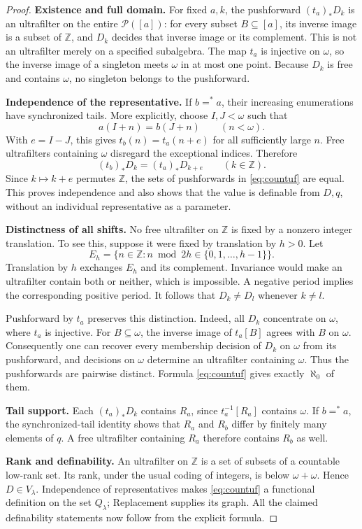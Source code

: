 \documentclass[11pt,letterpaper]{article}
\theoremstyle{definition}
\numberwithin{equation}{section}
\newcommand{\Pow}{\mathcal P}
\begin{document}
\begin{proof}
\textbf{Existence and full domain.}
For fixed $a,k$, the pushforward $(t_a)_*D_k$ is an ultrafilter on the
entire $\Pow([a])$: for every subset $B\subseteq[a]$, its inverse image is
a subset of $\mathbb Z$, and $D_k$ decides that inverse image or its
complement. This is not an ultrafilter merely on a specified subalgebra.
The map $t_a$ is injective on $\omega$, so the inverse image of a singleton
meets $\omega$ in at most one point. Because $D_k$ is free and contains
$\omega$, no singleton belongs to the pushforward.

\textbf{Independence of the representative.}
If $b=^*a$, their increasing enumerations have synchronized tails. More
explicitly, choose $I,J<\omega$ such that
\[
                            a(I+n)=b(J+n)
                                    \qquad(n<\omega).
\]
With $e=I-J$, this gives $t_b(n)=t_a(n+e)$ for all sufficiently large
$n$. Free ultrafilters containing $\omega$ disregard the exceptional
indices. Therefore
\[
                           (t_b)_*D_k=(t_a)_*D_{k+e}
                                   \qquad(k\in\mathbb Z).
\]
Since $k\mapsto k+e$ permutes $\mathbb Z$, the sets of pushforwards in
\eqref{eq:countuf} are equal. This proves independence and also shows
that the value is definable from $D,q$, without an individual
representative as a parameter.

\textbf{Distinctness of all shifts.}
No free ultrafilter on $\mathbb Z$ is fixed by a nonzero integer
translation. To see this, suppose it were fixed by translation by
$h>0$. Let
\[
          E_h=\{n\in\mathbb Z:n\bmod 2h\in\{0,1,\ldots,h-1\}\}.
\]
Translation by $h$ exchanges $E_h$ and its complement. Invariance would
make an ultrafilter contain both or neither, which is impossible.
A negative period implies the corresponding positive period. It follows
that $D_k\ne D_l$ whenever $k\ne l$.

Pushforward by $t_a$ preserves this distinction. Indeed, all $D_k$
concentrate on $\omega$, where $t_a$ is injective. For $B\subseteq\omega$,
the inverse image of $t_a[B]$ agrees with $B$ on $\omega$. Consequently
one can recover every membership decision of $D_k$ on $\omega$ from its
pushforward, and decisions on $\omega$ determine an ultrafilter containing
$\omega$. Thus the pushforwards are pairwise distinct. Formula
\eqref{eq:countuf} gives exactly $\aleph_0$ of them.

\textbf{Tail support.}
Each $(t_a)_*D_k$ contains $R_a$, since $t_a^{-1}[R_a]$ contains $\omega$.
If $b=^*a$, the synchronized-tail identity shows that $R_a$ and $R_b$
differ by finitely many elements of $q$. A free ultrafilter containing
$R_a$ therefore contains $R_b$ as well.

\textbf{Rank and definability.}
An ultrafilter on $\mathbb Z$ is a set of subsets of a countable
low-rank set. Its rank, under the usual coding of integers, is below
$\omega+\omega$. Hence $D\in V_\lambda$. Independence of representatives
makes \eqref{eq:countuf} a functional definition on the set $Q_\lambda$;
Replacement supplies its graph. All the claimed definability statements
now follow from the explicit formula.
\end{proof}
\end{document}
